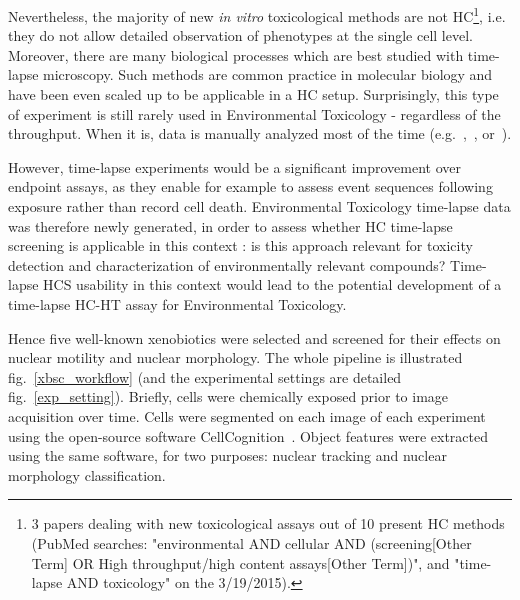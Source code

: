 Nevertheless, the majority of new \textit{in vitro} toxicological methods are not HC\footnote{3 papers dealing with new toxicological assays out of 10 present HC methods (PubMed searches: "environmental AND cellular AND (screening[Other Term] OR High throughput/high content assays[Other Term])", and "time-lapse AND toxicology" on the 3/19/2015).}, i.e. they do not allow detailed observation of phenotypes at the single cell level. Moreover, there are many biological processes which are best studied with time-lapse microscopy. Such methods are common practice in molecular biology and have been even scaled up to be applicable in a HC setup. Surprisingly, this type of experiment is still rarely used in Environmental Toxicology - regardless of the throughput. When it is, data is manually analyzed most of the time (e.g.~\cite{pmid17949680},~\cite{pmid15388243}, or~\cite{pmid24263567}).


However, time-lapse experiments would be a significant improvement over endpoint assays, as they enable for example to assess event sequences following exposure rather than record cell death. Environmental Toxicology time-lapse data was therefore newly generated, in order to assess whether HC time-lapse screening is applicable in this context : is this approach relevant for toxicity detection and characterization of environmentally relevant compounds? Time-lapse HCS usability in this context would lead to the potential development of a time-lapse HC-HT assay for Environmental Toxicology. %

Hence five well-known xenobiotics were selected and screened for their effects on nuclear motility and nuclear morphology. The whole pipeline is illustrated fig.~\ref{xbsc_workflow} (and the experimental settings are detailed fig.~\ref{exp_setting}). Briefly, cells were chemically exposed prior to image acquisition over time. Cells were segmented on each image of each experiment using the open-source software CellCognition~\cite{cellcognition}. Object features were extracted using the same software, for two purposes: nuclear tracking and nuclear morphology classification. 

